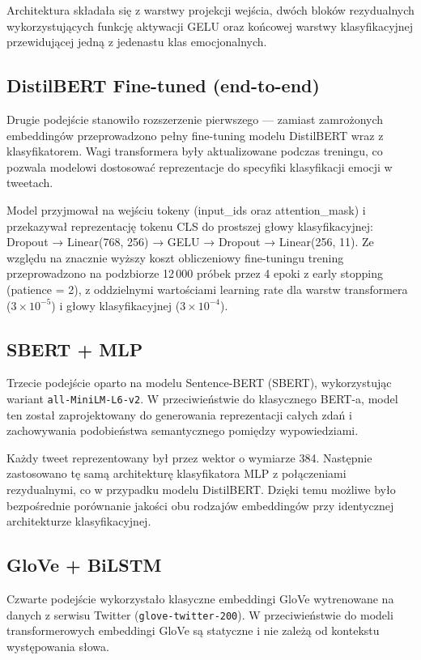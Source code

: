 \documentclass[a4paper,12pt]{article}
\begin{document}
Architektura składała się z warstwy projekcji wejścia, dwóch bloków rezydualnych wykorzystujących funkcję aktywacji GELU oraz końcowej warstwy klasyfikacyjnej przewidującej jedną z jedenastu klas emocjonalnych.

\subsection{DistilBERT Fine-tuned (end-to-end)}

Drugie podejście stanowiło rozszerzenie pierwszego — zamiast zamrożonych embeddingów przeprowadzono pełny fine-tuning modelu DistilBERT wraz z klasyfikatorem. Wagi transformera były aktualizowane podczas treningu, co pozwala modelowi dostosować reprezentacje do specyfiki klasyfikacji emocji w tweetach.

Model przyjmował na wejściu tokeny (input\_ids oraz attention\_mask) i przekazywał reprezentację tokenu CLS do prostszej głowy klasyfikacyjnej: Dropout → Linear(768, 256) → GELU → Dropout → Linear(256, 11). Ze względu na znacznie wyższy koszt obliczeniowy fine-tuningu trening przeprowadzono na podzbiorze 12\,000 próbek przez 4 epoki z early stopping (patience = 2), z oddzielnymi wartościami learning rate dla warstw transformera ($3 \times 10^{-5}$) i głowy klasyfikacyjnej ($3 \times 10^{-4}$).

\subsection{SBERT + MLP}

Trzecie podejście oparto na modelu Sentence-BERT (SBERT), wykorzystując wariant \texttt{all-MiniLM-L6-v2}. W przeciwieństwie do klasycznego BERT-a, model ten został zaprojektowany do generowania reprezentacji całych zdań i zachowywania podobieństwa semantycznego pomiędzy wypowiedziami.

Każdy tweet reprezentowany był przez wektor o wymiarze 384. Następnie zastosowano tę samą architekturę klasyfikatora MLP z połączeniami rezydualnymi, co w przypadku modelu DistilBERT. Dzięki temu możliwe było bezpośrednie porównanie jakości obu rodzajów embeddingów przy identycznej architekturze klasyfikacyjnej.

\subsection{GloVe + BiLSTM}

Czwarte podejście wykorzystało klasyczne embeddingi GloVe wytrenowane na danych z serwisu Twitter (\texttt{glove-twitter-200}). W przeciwieństwie do modeli transformerowych embeddingi GloVe są statyczne i nie zależą od kontekstu występowania słowa.
\end{document}
